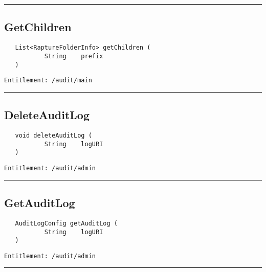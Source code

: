 \rule{12cm}{2pt}
\subsection{GetChildren}
\label{Api:GetChildren}
\begin{Verbatim}
   List<RaptureFolderInfo> getChildren (
           String    prefix
   )
\end{Verbatim}
\begin{Verbatim}[formatcom=\color{Maroon}]
  Entitlement: /audit/main
\end{Verbatim}



\rule{12cm}{2pt}
\subsection{DeleteAuditLog}
\label{Api:DeleteAuditLog}
\begin{Verbatim}
   void deleteAuditLog (
           String    logURI
   )
\end{Verbatim}
\begin{Verbatim}[formatcom=\color{Maroon}]
  Entitlement: /audit/admin
\end{Verbatim}



\rule{12cm}{2pt}
\subsection{GetAuditLog}
\label{Api:GetAuditLog}
\begin{Verbatim}
   AuditLogConfig getAuditLog (
           String    logURI
   )
\end{Verbatim}
\begin{Verbatim}[formatcom=\color{Maroon}]
  Entitlement: /audit/admin
\end{Verbatim}



\rule{12cm}{2pt}
